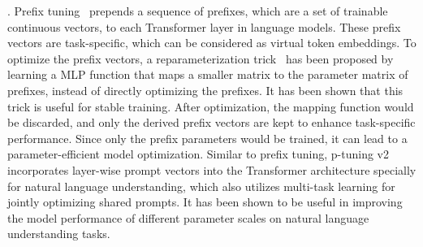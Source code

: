 . 
Prefix tuning~\cite{Li-ACL-2021-prefix} prepends a sequence of prefixes, which are a set of trainable continuous vectors,  to each Transformer layer in language models.  These prefix vectors are task-specific,  which can be considered as virtual token embeddings. To optimize the prefix vectors, a reparameterization trick~\cite{Li-ACL-2021-prefix} has been proposed by learning a MLP function that maps a smaller matrix to the parameter matrix of prefixes, instead of directly optimizing the prefixes.   
It has been shown that this trick is useful for stable training.  
After optimization, the mapping function would be discarded, and only the derived prefix vectors are kept to enhance task-specific performance. 
Since only the prefix parameters would be trained, it can lead to a  parameter-efficient model optimization.
Similar to prefix tuning, p-tuning v2~\cite{Liu-arXiv-2021-P-tuning} incorporates layer-wise prompt vectors into the Transformer architecture specially for natural language understanding, which also utilizes multi-task learning for jointly optimizing shared prompts.  
It has been shown to be useful in improving the model performance of different  parameter scales  on  natural language understanding tasks. 




